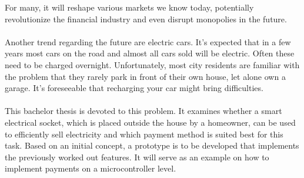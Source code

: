 For many, it will reshape various markets we know today, potentially revolutionize the financial industry and even disrupt monopolies in the future.
\\\\
Another trend regarding the future are electric cars.
It's expected that in a few years most cars on the road and almost all cars sold will be electric.
Often these need to be charged overnight.
Unfortunately, most city residents are familiar with the problem that they rarely park in front of their own house, let alone own a garage.
It's foreseeable that recharging your car might bring difficulties.
\\\\ 
This bachelor thesis is devoted to this problem.
It examines whether a smart electrical socket, which is placed outside the house by a homeowner, can be used to efficiently sell electricity and which payment method is suited best for this task.
Based on an initial concept, a prototype is to be developed that implements the previously worked out features.
It will serve as an example on how to implement  payments on a microcontroller level.
